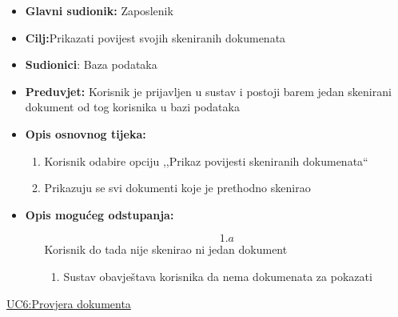 \documentclass{article} %
\begin{document}
\begin{itemize}
	\item \textbf{Glavni sudionik:} Zaposlenik
	
	
	\item \textbf{Cilj:}Prikazati povijest svojih skeniranih dokumenata
	
	
	\item \textbf{Sudionici}: Baza podataka
	
	
	\item \textbf{Preduvjet:} Korisnik je prijavljen u sustav i postoji barem jedan skenirani dokument od tog korisnika u bazi podataka
	
	
	\item \textbf{Opis osnovnog tijeka:} 
	\begin{enumerate}
		\item Korisnik odabire opciju ,,Prikaz povijesti skeniranih dokumenata``
		
		
		\item Prikazuju se svi dokumenti koje je prethodno skenirao
		
		
		
	\end{enumerate}
	\item \textbf{Opis mogućeg odstupanja:}
	
	\begin{enumerate}
		\item[$$1.a$$] Korisnik do tada nije skenirao ni jedan dokument
		
		\begin{enumerate}[label=\arabic*.]
			\item Sustav obavještava korisnika da nema dokumenata za pokazati
			
		\end{enumerate}
	\end{enumerate}
\end{itemize}
 

\noindent\underline{UC6:Provjera dokumenta}
\end{document}
